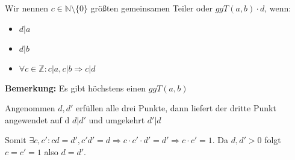 \documentclass[pdftex,12pt,a4paper,fleqn]{scrartcl}
\begin{document}
Wir nennen $c \in \mathbb{N}\setminus \{0\}$ größten gemeinsamen Teiler oder $ggT(a,b) \cdot d$, wenn:

\begin{itemize}
	\item $d | a$
	\item $d | b$
	\item $\forall c \in \mathbb{Z}: c | a, c | b \Rightarrow c | d$
\end{itemize}

\textbf{Bemerkung:} Es gibt höchstens einen $ggT(a,b)$

Angenommen $d,d'$ erfüllen alle drei Punkte, dann liefert der dritte Punkt angewendet auf d $d | d'$ und umgekehrt $d' | d$

Somit $\exists c,c' : cd=d', c'd'=d \Rightarrow c\cdot c' \cdot d' = d' \Rightarrow c \cdot c' = 1$. Da $d,d' > 0$ folgt $c = c' = 1$ also $d = d'$.


\end{document}
